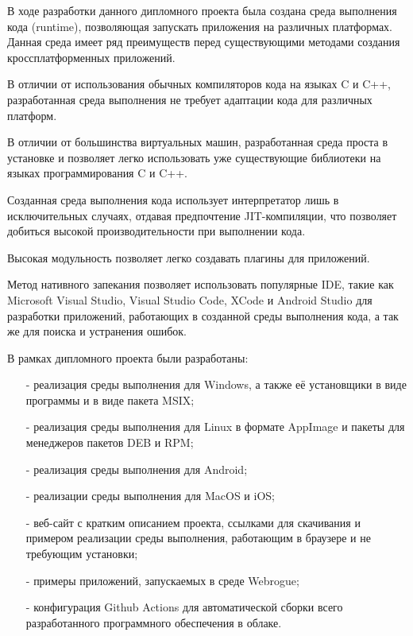 В ходе разработки данного дипломного проекта была создана среда выполнения кода (runtime), позволяющая запускать приложения на различных платформах.
Данная среда имеет ряд преимуществ перед существующими методами создания кроссплатформенных приложений.

В отличии от использования обычных компиляторов кода на языках C и C++, разработанная среда выполнения не требует адаптации кода для различных платформ. 

В отличии от большинства виртуальных машин, разработанная среда проста в установке и позволяет легко использовать уже существующие библиотеки на языках программирования C и C++.

Созданная среда выполнения кода использует интерпретатор лишь в исключительных случаях, отдавая предпочтение JIT-компиляции, что позволяет добиться высокой производительности при выполнении кода.

Высокая модульность позволяет легко создавать плагины для приложений.

Метод нативного запекания позволяет использовать популярные IDE, такие как Microsoft Visual Studio, Visual Studio Code, XCode и Android Studio для разработки приложений, работающих в созданной среды выполнения кода, а так же для поиска и устранения ошибок.

В рамках дипломного проекта были разработаны:
\begin{itemize}
    \item[-] реализация среды выполнения для Windows, а также её установщики в виде программы и в виде пакета MSIX;
    \item[-] реализация среды выполнения для Linux в формате AppImage и пакеты для менеджеров пакетов DEB и RPM;
    \item[-] реализация среды выполнения для Android;
    \item[-] реализации среды выполнения для MacOS и iOS;
    \item[-] веб-сайт с кратким описанием проекта, ссылками для скачивания и примером реализации среды выполнения, работающим в браузере и не требующим установки;
    \item[-] примеры приложений, запускаемых в среде Webrogue;
    \item[-] конфигурация Github Actions для автоматической сборки всего разработанного программного обеспечения в облаке.
\end{itemize}

